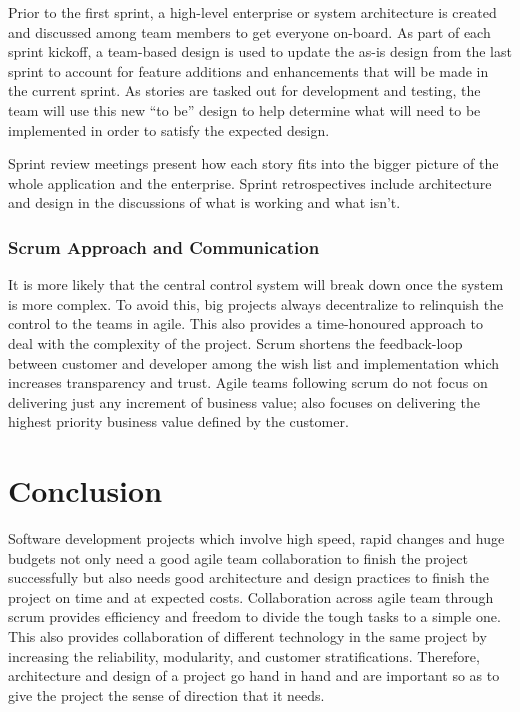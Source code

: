 \documentclass[sigplan,screen]{acmart}
\begin{document}
Prior to the first sprint, a high-level enterprise or system architecture is created and discussed among team members to get everyone on-board. As part of each sprint kickoff, a team-based design is used to update the as-is design from the last sprint to account for feature additions and enhancements that will be made in the current sprint. As stories are tasked out for development and testing, the team will use this new “to be” design to help determine what will need to be implemented in order to satisfy the expected design. \cite{Architecture01}

Sprint review meetings present how each story fits into the bigger picture of the whole application and the enterprise. Sprint retrospectives include architecture and design in the discussions of what is working and what isn’t.

\subsubsection{Scrum Approach and Communication}

It is more likely that the central control system will break down once the system is more complex. 
To avoid this, big projects always decentralize to relinquish the control to the teams in agile. This also provides a time-honoured approach to deal with the complexity of the project.\cite{book01} Scrum shortens the feedback-loop between customer and developer among the wish list and implementation which increases transparency and trust. Agile teams following scrum do not focus on delivering just any increment of business value; also focuses on delivering the highest priority business value defined by the customer.



\section{Conclusion}
Software development projects which involve high speed, rapid changes and huge budgets not only need a good agile team collaboration to finish the project successfully but also needs good architecture and design practices to finish the project on time and at expected costs.  Collaboration across agile team through scrum provides efficiency and freedom to divide the tough tasks to a simple one. This also provides collaboration of different technology in the same project by increasing the reliability, modularity, and customer stratifications. Therefore, architecture and design of a project go hand in hand and are important so as to give the project the sense of direction that it needs. 

%



% 
\appendix
\end{document}
